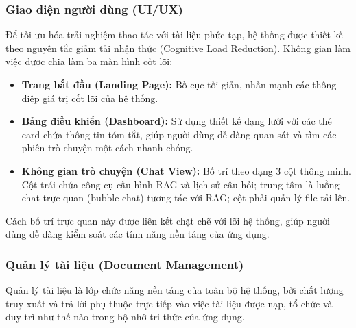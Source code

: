 \documentclass[10pt, conference, a4paper, compsocconf]{IEEEtran}
\begin{document}
\subsubsection{Giao diện người dùng (UI/UX)}
Để tối ưu hóa trải nghiệm thao tác với tài liệu phức tạp, hệ thống được thiết kế theo nguyên tắc giảm tải nhận thức (Cognitive Load Reduction). Không gian làm việc được chia làm ba màn hình cốt lõi:

\begin{itemize}
  \item \textbf{Trang bắt đầu (Landing Page):} Bố cục tối giản, nhấn mạnh các thông điệp giá trị cốt lõi của hệ thống.

  \item \textbf{Bảng điều khiển (Dashboard):} Sử dụng thiết kế dạng lưới với các thẻ card chứa thông tin tóm tắt, giúp người dùng dễ dàng quan sát và tìm các phiên trò chuyện một cách nhanh chóng.

  \item \textbf{Không gian trò chuyện (Chat View):} Bố trí theo dạng 3 cột thông minh. Cột trái chứa công cụ cấu hình RAG và lịch sử câu hỏi; trung tâm là luồng chat trực quan (bubble chat) tương tác với RAG; cột phải quản lý file tải lên.

\end{itemize}

\vspace{1em}
Cách bố trí trực quan này được liên kết chặt chẽ với lõi hệ thống, giúp người dùng dễ dàng kiểm soát các tính năng nền tảng của ứng dụng.
\vspace{1em}

\subsubsection{Quản lý tài liệu (Document Management)}
Quản lý tài liệu là lớp chức năng nền tảng của toàn bộ hệ thống, bởi chất lượng truy xuất và trả lời phụ thuộc trực tiếp vào việc tài liệu được nạp, tổ chức và duy trì như thế nào trong bộ nhớ tri thức của ứng dụng.
\end{document}
